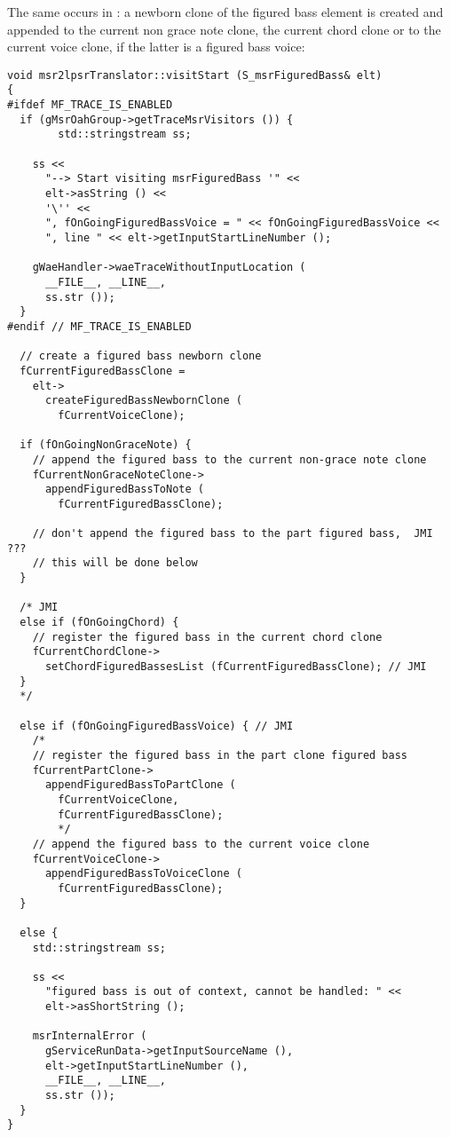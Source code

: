 The same occurs in : a newborn clone of the figured bass element is created and appended to the current non grace note clone, the current chord clone or to the current voice clone, if the latter is a figured bass voice: %
\begin{lstlisting}[language=CPlusPlus]
void msr2lpsrTranslator::visitStart (S_msrFiguredBass& elt)
{
#ifdef MF_TRACE_IS_ENABLED
  if (gMsrOahGroup->getTraceMsrVisitors ()) {
		std::stringstream ss;

    ss <<
      "--> Start visiting msrFiguredBass '" <<
      elt->asString () <<
      '\'' <<
      ", fOnGoingFiguredBassVoice = " << fOnGoingFiguredBassVoice <<
      ", line " << elt->getInputStartLineNumber ();

    gWaeHandler->waeTraceWithoutInputLocation (
      __FILE__, __LINE__,
      ss.str ());
  }
#endif // MF_TRACE_IS_ENABLED

  // create a figured bass newborn clone
  fCurrentFiguredBassClone =
    elt->
      createFiguredBassNewbornClone (
        fCurrentVoiceClone);

  if (fOnGoingNonGraceNote) {
    // append the figured bass to the current non-grace note clone
    fCurrentNonGraceNoteClone->
      appendFiguredBassToNote (
      	fCurrentFiguredBassClone);

    // don't append the figured bass to the part figured bass,  JMI ???
    // this will be done below
  }

  /* JMI
  else if (fOnGoingChord) {
    // register the figured bass in the current chord clone
    fCurrentChordClone->
      setChordFiguredBassesList (fCurrentFiguredBassClone); // JMI
  }
  */

  else if (fOnGoingFiguredBassVoice) { // JMI
    /*
    // register the figured bass in the part clone figured bass
    fCurrentPartClone->
      appendFiguredBassToPartClone (
        fCurrentVoiceClone,
        fCurrentFiguredBassClone);
        */
    // append the figured bass to the current voice clone
    fCurrentVoiceClone->
      appendFiguredBassToVoiceClone (
        fCurrentFiguredBassClone);
  }

  else {
    std::stringstream ss;

    ss <<
      "figured bass is out of context, cannot be handled: " <<
      elt->asShortString ();

    msrInternalError (
      gServiceRunData->getInputSourceName (),
      elt->getInputStartLineNumber (),
      __FILE__, __LINE__,
      ss.str ());
  }
}
\end{lstlisting}

